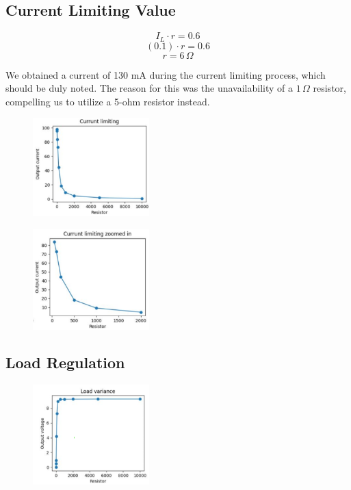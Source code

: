 \documentclass[12pt, a4paper]{article}
\begin{document}
\subsection{Current Limiting Value}

\begin{equation*}
I_L \cdot r = 0.6
\end{equation*}
\begin{equation*}
(0.1) \cdot r = 0.6
\end{equation*}
\begin{equation*}
r = 6\,\Omega
\end{equation*}

We obtained a current of 130 mA during the current limiting process, which should be duly noted. The reason for this was the unavailability of a $1\,\Omega$ resistor, compelling us to utilize a 5-ohm resistor instead.

\begin{figure}[h!]
\centering
    \includegraphics[width=0.4\textwidth]{Current Limiting.png}
\end{figure}

\begin{figure}[h!]
\centering
    \includegraphics[width=0.4\textwidth]{Current Limiting Zoomed.png}
\end{figure}

\newpage
\subsection{Load Regulation}

\begin{figure}[h!]
\centering
    \includegraphics[width=0.4\textwidth]{Load Variance.png}
\end{figure}
\end{document}
